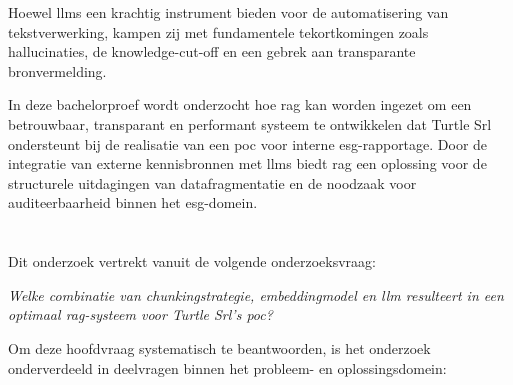 Hoewel \glspl{llm} een krachtig instrument bieden voor de automatisering van tekstverwerking, kampen zij met fundamentele tekortkomingen zoals hallucinaties, de \gls{knowledge-cut-off} en een gebrek aan transparante bronvermelding.

In deze bachelorproef wordt onderzocht hoe \gls{rag} kan worden ingezet om een betrouwbaar, transparant en performant systeem te ontwikkelen dat Turtle Srl ondersteunt bij de realisatie van een \gls{poc} voor interne \gls{esg}-rapportage. Door de integratie van externe kennisbronnen met \glspl{llm} biedt \gls{rag} een oplossing voor de structurele uitdagingen van datafragmentatie en de noodzaak voor auditeerbaarheid binnen het \gls{esg}-domein.

\section{}%
\label{sec:onderzoeksvraag}

Dit onderzoek vertrekt vanuit de volgende onderzoeksvraag:

\textit{Welke combinatie van chunkingstrategie, embeddingmodel en \gls{llm} resulteert in een optimaal \gls{rag}-systeem voor Turtle Srl’s \gls{poc}?}

Om deze hoofdvraag systematisch te beantwoorden, is het onderzoek onderverdeeld in deelvragen binnen het probleem- en oplossingsdomein:

